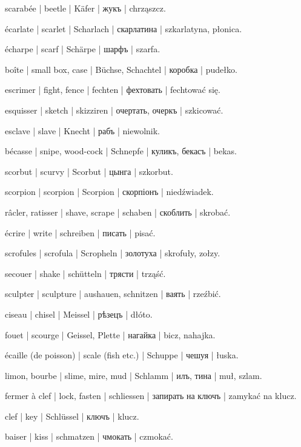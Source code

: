 \begin{outdent}{1em}
scarabée | beetle | Käfer | жукъ | chrząszcz.

écarlate | scarlet | Scharlach | скарлатина | szkarlatyna,
płonica.

écharpe | scarf | Schärpe | шарфъ | szarfa.

boîte | small box, case | Büchse, Schachtel | коробка | pudełko.

escrimer | fight, fence | fechten | фехтовать | fechtować
się.

esquisser | sketch | skizziren | очертать, очеркъ | szkicować.

esclave | slave | Knecht | рабъ | niewolnik.

bécasse | snipe, wood-cock | Schnepfe | куликъ, бекасъ | bekas.

scorbut | scurvy | Scorbut | цынга | szkorbut.

scorpion | scorpion | Scorpion | скорпіонъ | niedźwiadek.

râcler, ratisser | shave, scrape | schaben | скоблить | skrobać.

écrire | write | schreiben | писать | pisać.

scrofules | scrofula | Scropheln | золотуха | skrofuły,
zołzy.

secouer | shake | schütteln | трясти | trząść.

sculpter | sculpture | aushauen, schnitzen | ваять | rzeźbić.

\uvsubentry{}
ciseau | chisel | Meissel | рѣзецъ | dłóto.

fouet | scourge | Geissel, Plette | нагайка | bicz, nahajka.

écaille (de poisson) | scale (fish etc.) | Schuppe | чешуя | łuska.

limon, bourbe | slime, mire, mud | Schlamm | илъ, тина | muł, szlam.

fermer à clef | lock, fasten | schliessen | запирать на ключъ | zamykać na klucz.

\uvsubentry{}
clef | key | Schlüssel | ключъ | klucz.

baiser | kiss | schmatzen | чмокать | czmokać.


\end{outdent}
